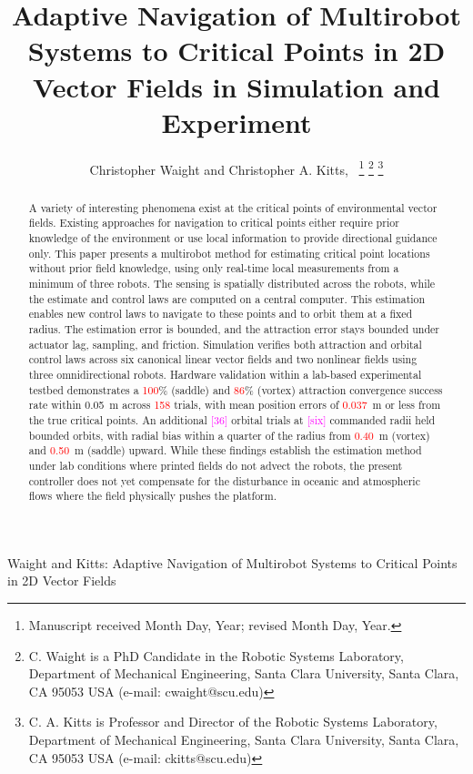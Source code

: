 \documentclass[lettersize,journal]{IEEEtran}
\newcommand{\syn}[1]{\textcolor{red}{#1}}            %
\newcommand{\open}[1]{\textcolor{magenta}{[#1]}}     %
\begin{document}
\title{Adaptive Navigation of Multirobot Systems to Critical Points in 2D Vector Fields in Simulation and Experiment}
\author{Christopher Waight and Christopher A. Kitts,~
\thanks{Manuscript received Month Day, Year; revised Month Day, Year.}
\thanks{C. Waight is a PhD Candidate in the Robotic Systems Laboratory, Department of Mechanical Engineering, Santa Clara University, Santa Clara, CA 95053 USA (e-mail: cwaight@scu.edu)}
\thanks{C. A. Kitts is Professor and Director of the Robotic Systems Laboratory, Department of Mechanical Engineering, Santa Clara University, Santa Clara, CA 95053 USA (e-mail: ckitts@scu.edu)}
}
%
{Waight and Kitts: Adaptive Navigation of Multirobot Systems to Critical Points in 2D Vector Fields}


\maketitle

\begin{abstract}
    A variety of interesting phenomena exist at the critical points of environmental vector fields. Existing approaches for navigation to critical points either require prior knowledge of the environment or use local information to provide directional guidance only. This paper presents a multirobot method for estimating critical point locations without prior field knowledge, using only real-time local measurements from a minimum of three robots. The sensing is spatially distributed across the robots, while the estimate and control laws are computed on a central computer.
    This estimation enables new control laws to navigate to these points and to orbit them at a fixed radius.
    The estimation error is bounded, and the attraction error stays bounded under actuator lag, sampling, and friction.
    Simulation verifies both attraction and orbital control laws across six canonical linear vector fields and two nonlinear fields using three omnidirectional robots. Hardware validation within a lab-based experimental testbed demonstrates a \syn{100}\% (saddle) and \syn{86}\% (vortex) attraction convergence success rate within 0.05~m across \syn{158} trials, with mean position errors of \syn{0.037}~m or less from the true critical points. An additional \open{36} orbital trials at \open{six} commanded radii held bounded orbits, with radial bias within a quarter of the radius from \syn{0.40}~m (vortex) and \syn{0.50}~m (saddle) upward. %
    While these findings establish the estimation method under lab conditions where printed fields do not advect the robots, the present controller does not yet compensate for the disturbance in oceanic and atmospheric flows where the field physically pushes the platform.

\end{abstract}
\end{document}
